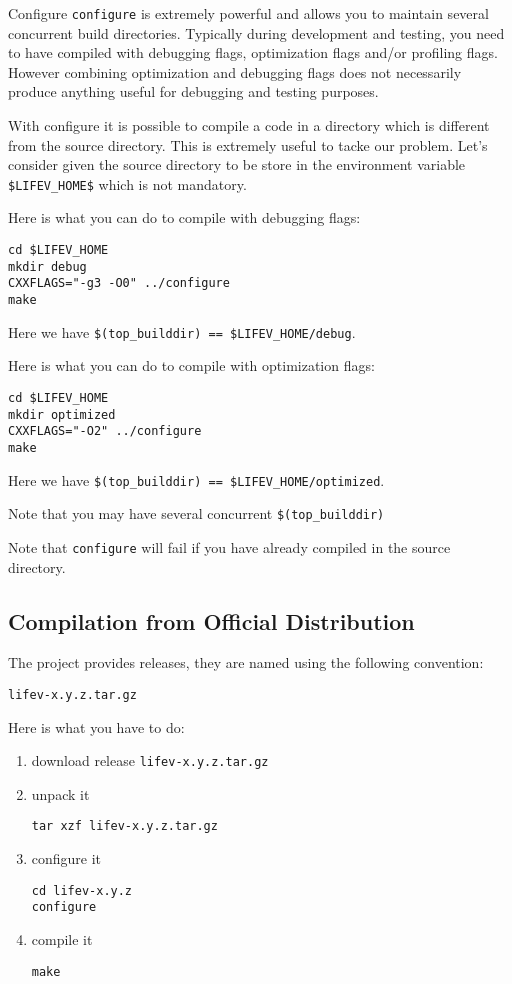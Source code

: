\begin{hint}{Configure}
  \label{hint:configure}
  \verb!configure! is extremely powerful and allows you to maintain
  several concurrent build directories. Typically during development
  and testing, you need to have \lifev compiled with debugging flags,
  optimization flags and/or profiling flags. However combining
  optimization and debugging flags does not necessarily produce
  anything useful for debugging and testing purposes.
  
  With configure it is possible to compile a code in a directory which
  is different from the source directory. This is extremely useful to
  tacke our problem. Let's consider given the source directory to be
  store in the environment variable \verb!$LIFEV_HOME$! which is not
  mandatory.

Here is what you can do to compile with debugging flags:
\begin{verbatim}
cd $LIFEV_HOME 
mkdir debug
CXXFLAGS="-g3 -O0" ../configure
make
\end{verbatim}
Here we have \verb+$(top_builddir) == $LIFEV_HOME/debug+.

Here is what you can do to compile with optimization flags:
\begin{verbatim}
cd $LIFEV_HOME
mkdir optimized
CXXFLAGS="-O2" ../configure
make
\end{verbatim}
Here we have \verb+$(top_builddir) == $LIFEV_HOME/optimized+.

\noindent Note that you may have several concurrent \verb+$(top_builddir)+

\noindent Note that \verb!configure! will fail if you have already compiled
\lifev in the source directory. 


\end{hint}


\subsection{Compilation from Official Distribution}
\label{sec:comp-from-offic}
The \lifev project provides releases, they are named using the following convention:
\begin{center}
\verb!lifev-x.y.z.tar.gz!
\end{center}

Here is what you have to do:

\begin{enumerate}
\item download \lifev release \verb!lifev-x.y.z.tar.gz!
\item unpack it
\begin{verbatim}
tar xzf lifev-x.y.z.tar.gz
\end{verbatim}
\item configure it
\begin{verbatim}
cd lifev-x.y.z
configure
\end{verbatim}
\item compile it
\begin{verbatim}
make
\end{verbatim}
\end{enumerate}

